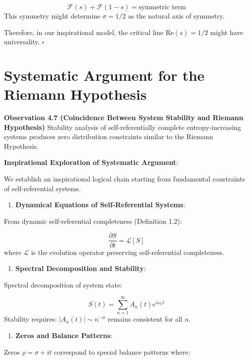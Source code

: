 \begin{equation}
\mathcal{F}(s) + \mathcal{F}(1-s) = \text{symmetric term}
\end{equation}
   This symmetry might determine $\sigma = 1/2$ as the natural axis of symmetry.

Therefore, in our inspirational model, the critical line $\text{Re}(s) = 1/2$ might have universality. $\square$

\section{Systematic Argument for the Riemann Hypothesis}
\label{sec:ch04_riemann:systematic-argument-for-the-riemann-hypothesis}

\textbf{Observation 4.7 (Coincidence Between System Stability and Riemann Hypothesis)}
\label{obs:4.7}
Stability analysis of self-referentially complete entropy-increasing systems produces zero distribution constraints similar to the Riemann Hypothesis.

\textbf{Inspirational Exploration of Systematic Argument}:

We establish an inspirational logical chain starting from fundamental constraints of self-referential systems.

\begin{enumerate}
\item \textbf{Dynamical Equations of Self-Referential Systems}:
\end{enumerate}
   From dynamic self-referential completeness (Definition 1.2):
   
\begin{equation}
\frac{\partial S}{\partial t} = \mathcal{L}[S]
\end{equation}
   where $\mathcal{L}$ is the evolution operator preserving self-referential completeness.
   
\begin{enumerate}
\item \textbf{Spectral Decomposition and Stability}:
\end{enumerate}
   Spectral decomposition of system state:
   
\begin{equation}
S(t) = \sum_{n=1}^{\infty} A_n(t) e^{i\omega_n t}
\end{equation}
   Stability requires: $|A_n(t)| \sim n^{-\sigma}$ remains consistent for all $n$.
   
\begin{enumerate}
\item \textbf{Zeros and Balance Patterns}:
\end{enumerate}
   Zeros $\rho = \sigma + it$ correspond to special balance patterns where:
   
